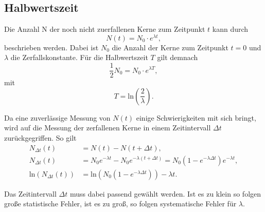\subsection{Halbwertszeit}
Die Anzahl N der noch nicht zuerfallenen Kerne zum Zeitpunkt $t$ kann durch
\begin{equation}
    N(t)=N_0\cdot e^{\lambda t},
\end{equation}
beschrieben werden. 
Dabei ist $N_0$ die Anzahl der Kerne zum Zeitpunkt $t=0$ und $\lambda$ 
die Zerfallskonstante. 
Für die Halbwertszeit $T$ gilt demnach
\begin{equation}
    \frac{1}{2}N_0=N_0\cdot e^{\lambda T},
\end{equation}
mit
\begin{equation}
    T=\text{ln}\left(\frac{2}{\lambda}\right).
\end{equation}

Da eine zuverlässige Messung von $N(t)$ einige Schwierigkeiten mit sich bringt, 
wird auf die Messung der zerfallenen Kerne in einem Zeitintervall $\Delta t$ zurückgegriffen.
So gilt
\begin{align}
    N_{\Delta t}(t)&=N(t)-N(t+\Delta t),\\
    N_{\Delta t}(t)&=N_0e^{-\lambda t}-N_0e^{-\lambda(t+\Delta t)}=N_0(1-e^{-\lambda\Delta t})e^{-\lambda t},\\
    \text{ln}(N_{\Delta t}(t))&=\text{ln}\left(N_0(1-e^{-\lambda\Delta t})\right)-\lambda t. \label{eqn:Zerfallsgesetz}
\end{align}

Das Zeitintervall $\Delta t$ muss dabei passend gewählt werden. 
Ist es zu klein so folgen große statistische Fehler, ist es zu groß, 
so folgen systematische Fehler für $\lambda$.
\label{subsec:halbwertszeit}